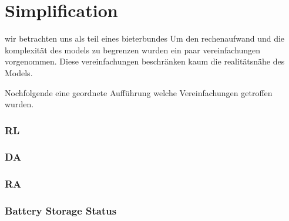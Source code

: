\section{Simplification}

wir betrachten uns als teil eines bieterbundes
Um den rechenaufwand und die komplexität des models zu begrenzen wurden ein paar vereinfachungen vorgenommen.
Diese vereinfachungen beschränken kaum die realitätsnähe des Models.

Nochfolgende eine geordnete Aufführung welche Vereinfachungen getroffen wurden.
\subsubsection{RL}
\subsubsection{DA}
\subsubsection{RA}
\subsubsection{Battery Storage Status}